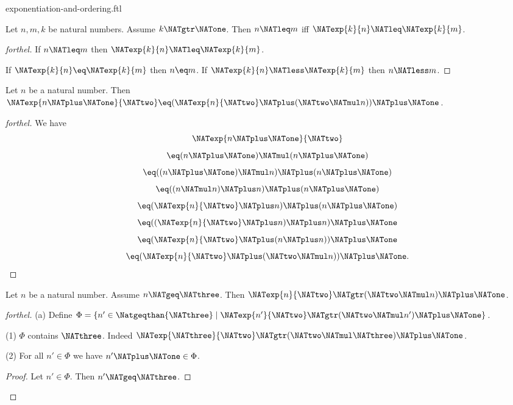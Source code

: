\documentclass{naproche-library}
\begin{document}
\begin{smodule}[title=Exponentiation and Ordering]{exponentiation-and-ordering.ftl}
\begin{corollary}[forthel,id=ARITHMETIC_09_2876620253691904]
  Let $n, m, k$ be natural numbers.
  Assume $k \NATgtr \NATone$.
  Then $n \NATleq m$ iff $\NATexp{k}{n} \NATleq \NATexp{k}{m}$.
\end{corollary}
\begin{proof}[forthel]
  If $n \NATleq m$ then $\NATexp{k}{n} \NATleq \NATexp{k}{m}$.

  If $\NATexp{k}{n} \eq \NATexp{k}{m}$ then $n \eq m$.
  If $\NATexp{k}{n} \NATless \NATexp{k}{m}$ then $n \NATless m$.
\end{proof}

\begin{proposition}[forthel,id=ARITHMETIC_09_6984104377581568]
  Let $n$ be a natural number.
  Then $\NATexp{n \NATplus \NATone}{\NATtwo} \eq (\NATexp{n}{\NATtwo} \NATplus (\NATtwo \NATmul n)) \NATplus \NATone$.
\end{proposition}
\begin{proof}[forthel]
  We have
  \[  \NATexp{n \NATplus \NATone}{\NATtwo}                       \]
  \[    \eq (n \NATplus \NATone) \NATmul (n \NATplus \NATone)         \]
  \[    \eq ((n \NATplus \NATone) \NATmul n) \NATplus (n \NATplus \NATone)   \]
  \[    \eq ((n \NATmul n) \NATplus n) \NATplus (n \NATplus \NATone)   \]
  \[    \eq (\NATexp{n}{\NATtwo} \NATplus n) \NATplus (n \NATplus \NATone)         \]
  \[    \eq ((\NATexp{n}{\NATtwo} \NATplus n) \NATplus n) \NATplus \NATone         \]
  \[    \eq (\NATexp{n}{\NATtwo} \NATplus (n \NATplus n)) \NATplus \NATone         \]
  \[    \eq (\NATexp{n}{\NATtwo} \NATplus (\NATtwo \NATmul n)) \NATplus \NATone.    \]
\end{proof}

\begin{proposition}[forthel,id=ARITHMETIC_09_134060414337024]
  Let $n$ be a natural number.
  Assume $n \NATgeq \NATthree$.
  Then $\NATexp{n}{\NATtwo} \NATgtr (\NATtwo \NATmul n) \NATplus \NATone$.
\end{proposition}
\begin{proof}[forthel]
  (a) Define $\Phi = \{ n' \in \Natgeqthan{\NATthree} \mid \NATexp{n'}{\NATtwo} \NATgtr (\NATtwo \NATmul n') \NATplus \NATone \}$.

  (1) $\Phi$ contains $\NATthree$.
  Indeed $\NATexp{\NATthree}{\NATtwo} \NATgtr (\NATtwo \NATmul \NATthree) \NATplus \NATone$.

  (2) For all $n' \in \Phi$ we have $n' \NATplus \NATone \in \Phi$.
  \begin{proof}
    Let $n' \in \Phi$.
    Then $n' \NATgeq \NATthree$.


\end{proof}
\end{proof}
\end{smodule}
\end{document}
